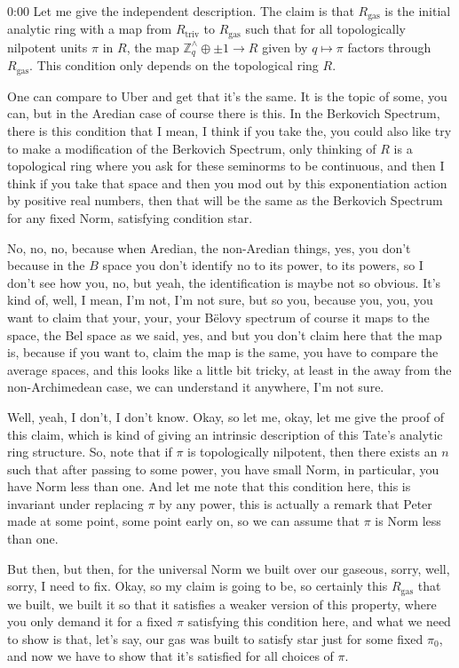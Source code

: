 \begin{unfinished}{0:00}
Let me give the independent description. The claim is that $R_{\text{gas}}$ is the initial analytic ring with a map from $R_{\text{triv}}$ to $R_{\text{gas}}$ such that for all topologically nilpotent units $\pi$ in $R$, the map $\mathbb{Z}_q^\wedge \oplus \pm 1 \to R$ given by $q \mapsto \pi$ factors through $R_{\text{gas}}$. This condition only depends on the topological ring $R$.

One can compare to Uber and get that it's the same. It is the topic of some, you can, but in the Aredian case of course there is this. In the Berkovich Spectrum, there is this condition that I mean, I think if you take the, you could also like try to make a modification of the Berkovich Spectrum, only thinking of $R$ is a topological ring where you ask for these seminorms to be continuous, and then I think if you take that space and then you mod out by this exponentiation action by positive real numbers, then that will be the same as the Berkovich Spectrum for any fixed Norm, satisfying condition star.

No, no, no, because when Aredian, the non-Aredian things, yes, you don't because in the $B$ space you don't identify no to its power, to its powers, so I don't see how you, no, but yeah, the identification is maybe not so obvious. It's kind of, well, I mean, I'm not, I'm not sure, but so you, because you, you, you want to claim that your, your, your Bëlovy spectrum of course it maps to the space, the Bel space as we said, yes, and but you don't claim here that the map is, because if you want to, claim the map is the same, you have to compare the average spaces, and this looks like a little bit tricky, at least in the away from the non-Archimedean case, we can understand it anywhere, I'm not sure.

Well, yeah, I don't, I don't know. Okay, so let me, okay, let me give the proof of this claim, which is kind of giving an intrinsic description of this Tate's analytic ring structure. So, note that if $\pi$ is topologically nilpotent, then there exists an $n$ such that after passing to some power, you have small Norm, in particular, you have Norm less than one. And let me note that this condition here, this is invariant under replacing $\pi$ by any power, this is actually a remark that Peter made at some point, some point early on, so we can assume that $\pi$ is Norm less than one.

But then, but then, for the universal Norm we built over our gaseous, sorry, well, sorry, I need to fix. Okay, so my claim is going to be, so certainly this $R_\mathrm{gas}$ that we built, we built it so that it satisfies a weaker version of this property, where you only demand it for a fixed $\pi$ satisfying this condition here, and what we need to show is that, let's say, our gas was built to satisfy star just for some fixed $\pi_0$, and now we have to show that it's satisfied for all choices of $\pi$.


\end{unfinished}
